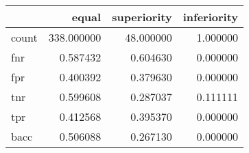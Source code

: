 \begin{tabular}{lrrr}
\toprule
{} &       equal &  superiority &  inferiority \\
\midrule
count &  338.000000 &    48.000000 &     1.000000 \\
fnr   &    0.587432 &     0.604630 &     0.000000 \\
fpr   &    0.400392 &     0.379630 &     0.000000 \\
tnr   &    0.599608 &     0.287037 &     0.111111 \\
tpr   &    0.412568 &     0.395370 &     0.000000 \\
bacc  &    0.506088 &     0.267130 &     0.000000 \\
\bottomrule
\end{tabular}
